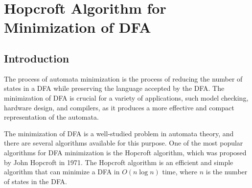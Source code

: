\chapter{Hopcroft Algorithm for Minimization of DFA}

\section{Introduction}
The process of automata minimization is the process of reducing the number of states in a DFA while preserving the language accepted by the DFA. The minimization of DFA is crucial for a variety of applications, such model checking, hardware 
design, and compilers, as it produces a more effective and compact representation of the automata.

The minimization of DFA is a well-studied problem in automata theory, and there are several algorithms available for this purpose. One of the most popular algorithms for DFA minimization is the Hopcroft algorithm, which was proposed by John Hopcroft in 1971. The Hopcroft algorithm is an efficient and simple algorithm that can minimize a DFA in $O(n \log n)$ time, where $n$ is the number of states in the DFA.